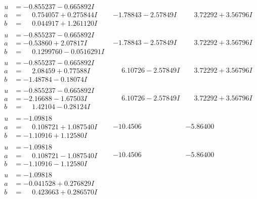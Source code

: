 \documentclass[1p]{elsarticle_modified}
\theoremstyle{definition}
\begin{document}
$$\begin{array}{c|c|c}
\begin{aligned}
u &= -0.855237 - 0.665892 I \\
a &= \phantom{-}0.754057 + 0.275844 I \\
b &= \phantom{-}0.044917 + 1.261120 I\end{aligned}
 & -1.78843 - 2.57849 I & \phantom{-}3.72292 + 3.56796 I \\ \hline\begin{aligned}
u &= -0.855237 - 0.665892 I \\
a &= -0.53860 + 2.07817 I \\
b &= \phantom{-}0.1299760 - 0.0516291 I\end{aligned}
 & -1.78843 - 2.57849 I & \phantom{-}3.72292 + 3.56796 I \\ \hline\begin{aligned}
u &= -0.855237 - 0.665892 I \\
a &= \phantom{-}2.08459 + 0.77588 I \\
b &= -1.48784 - 0.18074 I\end{aligned}
 & \phantom{-}6.10726 - 2.57849 I & \phantom{-}3.72292 + 3.56796 I \\ \hline\begin{aligned}
u &= -0.855237 - 0.665892 I \\
a &= -2.16688 - 1.67503 I \\
b &= \phantom{-}1.42104 - 0.28124 I\end{aligned}
 & \phantom{-}6.10726 - 2.57849 I & \phantom{-}3.72292 + 3.56796 I \\ \hline\begin{aligned}
u &= -1.09818\phantom{ +0.000000I} \\
a &= \phantom{-}0.108721 + 1.087540 I \\
b &= -1.10916 + 1.12580 I\end{aligned}
 & -10.4506\phantom{ +0.000000I} & -5.86400\phantom{ +0.000000I} \\ \hline\begin{aligned}
u &= -1.09818\phantom{ +0.000000I} \\
a &= \phantom{-}0.108721 - 1.087540 I \\
b &= -1.10916 - 1.12580 I\end{aligned}
 & -10.4506\phantom{ +0.000000I} & -5.86400\phantom{ +0.000000I} \\ \hline\begin{aligned}
u &= -1.09818\phantom{ +0.000000I} \\
a &= -0.041528 + 0.276829 I \\
b &= \phantom{-}0.423663 + 0.286570 I\end{aligned}

\end{array}$$
\end{document}
